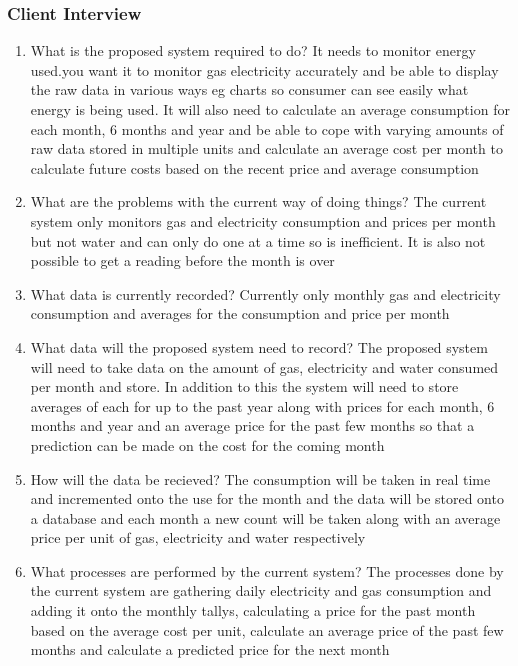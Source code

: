 \subsubsection{Client Interview}
\begin{enumerate}
	\item What is the proposed system required to do?
It needs to monitor energy used.you want it to monitor gas electricity accurately and be able to display the raw data in various ways eg charts so consumer can see easily what energy is being used. It will also need to calculate an average consumption for each month, 6 months and year and be able to cope with varying amounts of raw data stored in multiple units and calculate an average cost per month to calculate future costs based on the recent price and average consumption

	\item What are the problems with the current way of doing things?
The current system only monitors gas and electricity consumption and prices per month but not water and can only do one at a time so is inefficient. It is also not possible to get a reading before the month is over

	\item What data is currently recorded?
Currently only monthly gas and electricity consumption and averages for the consumption and price per month

	\item What data will the proposed system need to record?
The proposed system will need to take data on the amount of gas, electricity and water consumed per month and store. In addition to this the system will need to store averages of each for up to the past year along with prices for each month, 6 months and year and an average price for the past few months so that a prediction can be made on the cost for the coming month

	\item How will the data be recieved?
The consumption will be taken in real time and incremented onto the use for the month and the data will be stored onto a database and each month a new count will be taken along with an average price per unit of gas, electricity and water respectively

	\item What processes are performed by the current system?
The processes done by the current system are gathering daily electricity and gas consumption and adding it onto the monthly tallys, calculating a price for the past month based on the average cost per unit, calculate an average price of the past few months and calculate a predicted price for the next month


\end{enumerate}
